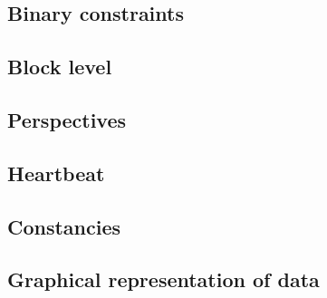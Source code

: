 \subsection{Binary constraints}                                             \label{user txn data: generalities: binary}                         
\subsection{Block level}                                                    \label{user txn data: generalities: block level}                    
\subsection{Perspectives}                                                   \label{user txn data: generalities: perspectives}                   
\subsection{Heartbeat}                                                      \label{user txn data: generalities: heartbeat}                      
\subsection{Constancies}                                                    \label{user txn data: generalities: constancies}                    
\subsection{Graphical representation of data}                               \label{user txn data: generalities: graphical representation}       
